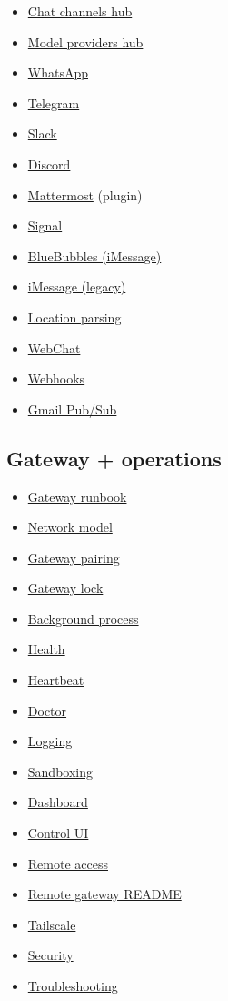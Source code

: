 \begin{itemize}
  \item \href{/channels}{Chat channels hub}
  \item \href{/providers/models}{Model providers hub}
  \item \href{/channels/whatsapp}{WhatsApp}
  \item \href{/channels/telegram}{Telegram}
  \item \href{/channels/slack}{Slack}
  \item \href{/channels/discord}{Discord}
  \item \href{/channels/mattermost}{Mattermost} (plugin)
  \item \href{/channels/signal}{Signal}
  \item \href{/channels/bluebubbles}{BlueBubbles (iMessage)}
  \item \href{/channels/imessage}{iMessage (legacy)}
  \item \href{/channels/location}{Location parsing}
  \item \href{/web/webchat}{WebChat}
  \item \href{/automation/webhook}{Webhooks}
  \item \href{/automation/gmail-pubsub}{Gmail Pub/Sub}
\end{itemize}


\subsection{Gateway + operations}


\begin{itemize}
  \item \href{/gateway}{Gateway runbook}
  \item \href{/gateway/network-model}{Network model}
  \item \href{/gateway/pairing}{Gateway pairing}
  \item \href{/gateway/gateway-lock}{Gateway lock}
  \item \href{/gateway/background-process}{Background process}
  \item \href{/gateway/health}{Health}
  \item \href{/gateway/heartbeat}{Heartbeat}
  \item \href{/gateway/doctor}{Doctor}
  \item \href{/gateway/logging}{Logging}
  \item \href{/gateway/sandboxing}{Sandboxing}
  \item \href{/web/dashboard}{Dashboard}
  \item \href{/web/control-ui}{Control UI}
  \item \href{/gateway/remote}{Remote access}
  \item \href{/gateway/remote-gateway-readme}{Remote gateway README}
  \item \href{/gateway/tailscale}{Tailscale}
  \item \href{/gateway/security}{Security}
  \item \href{/gateway/troubleshooting}{Troubleshooting}
\end{itemize}


